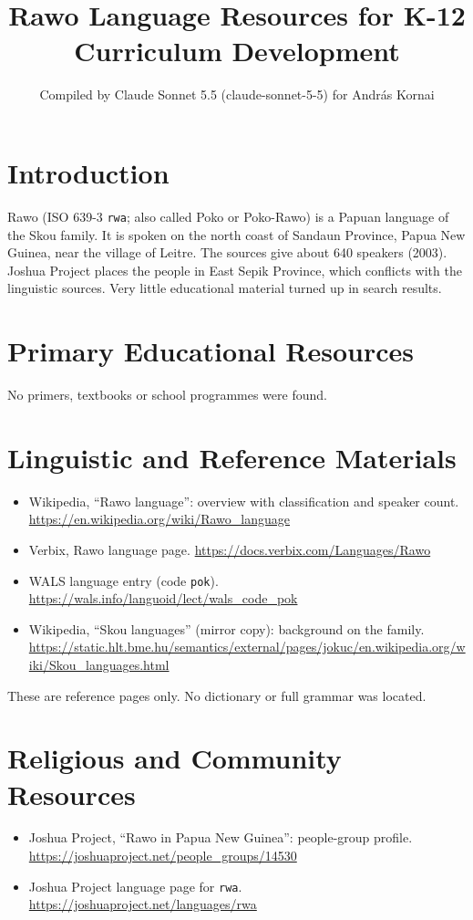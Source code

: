 \documentclass[12pt]{article}
\title{Rawo Language Resources for K-12 Curriculum Development}
\author{Compiled by Claude Sonnet 5.5 (claude-sonnet-5-5) for Andr\'as Kornai}
\date{}
\begin{document}
\maketitle

\section{Introduction}
Rawo (ISO 639-3 \texttt{rwa}; also called Poko or Poko-Rawo) is a Papuan language of the Skou family. It is spoken on the north coast of Sandaun Province, Papua New Guinea, near the village of Leitre. The sources give about 640 speakers (2003). Joshua Project places the people in East Sepik Province, which conflicts with the linguistic sources. Very little educational material turned up in search results.

\section{Primary Educational Resources}
No primers, textbooks or school programmes were found.

\section{Linguistic and Reference Materials}
\begin{itemize}
\item Wikipedia, ``Rawo language'': overview with classification and speaker count. \url{https://en.wikipedia.org/wiki/Rawo_language}
\item Verbix, Rawo language page. \url{https://docs.verbix.com/Languages/Rawo}
\item WALS language entry (code \texttt{pok}). \url{https://wals.info/languoid/lect/wals_code_pok}
\item Wikipedia, ``Skou languages'' (mirror copy): background on the family. \url{https://static.hlt.bme.hu/semantics/external/pages/jokuc/en.wikipedia.org/wiki/Skou_languages.html}
\end{itemize}
These are reference pages only. No dictionary or full grammar was located.

\section{Religious and Community Resources}
\begin{itemize}
\item Joshua Project, ``Rawo in Papua New Guinea'': people-group profile. \url{https://joshuaproject.net/people_groups/14530}
\item Joshua Project language page for \texttt{rwa}. \url{https://joshuaproject.net/languages/rwa}
\end{itemize}
\end{document}
